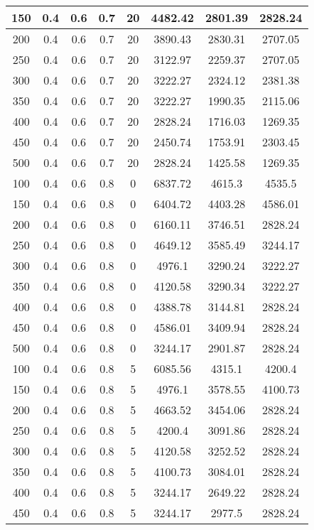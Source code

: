 \documentclass[a4paper, 12pt]{extreport}
\begin{document}
\begin{itemize}
\begin{longtable}{|c|c|c|c|c|c|c|c|}
			150 & 0.4 & 0.6 & 0.7 & 20 & 4482.42 & 2801.39 & 2828.24 \\\hline
			200 & 0.4 & 0.6 & 0.7 & 20 & 3890.43 & 2830.31 & 2707.05 \\\hline
			250 & 0.4 & 0.6 & 0.7 & 20 & 3122.97 & 2259.37 & 2707.05 \\\hline
			300 & 0.4 & 0.6 & 0.7 & 20 & 3222.27 & 2324.12 & 2381.38 \\\hline
			350 & 0.4 & 0.6 & 0.7 & 20 & 3222.27 & 1990.35 & 2115.06 \\\hline
			400 & 0.4 & 0.6 & 0.7 & 20 & 2828.24 & 1716.03 & 1269.35 \\\hline
			450 & 0.4 & 0.6 & 0.7 & 20 & 2450.74 & 1753.91 & 2303.45 \\\hline
			500 & 0.4 & 0.6 & 0.7 & 20 & 2828.24 & 1425.58 & 1269.35 \\\hline
			100 & 0.4 & 0.6 & 0.8 & 0 & 6837.72 & 4615.3 & 4535.5 \\\hline
			150 & 0.4 & 0.6 & 0.8 & 0 & 6404.72 & 4403.28 & 4586.01 \\\hline
			200 & 0.4 & 0.6 & 0.8 & 0 & 6160.11 & 3746.51 & 2828.24 \\\hline
			250 & 0.4 & 0.6 & 0.8 & 0 & 4649.12 & 3585.49 & 3244.17 \\\hline
			300 & 0.4 & 0.6 & 0.8 & 0 & 4976.1 & 3290.24 & 3222.27 \\\hline
			350 & 0.4 & 0.6 & 0.8 & 0 & 4120.58 & 3290.34 & 3222.27 \\\hline
			400 & 0.4 & 0.6 & 0.8 & 0 & 4388.78 & 3144.81 & 2828.24 \\\hline
			450 & 0.4 & 0.6 & 0.8 & 0 & 4586.01 & 3409.94 & 2828.24 \\\hline
			500 & 0.4 & 0.6 & 0.8 & 0 & 3244.17 & 2901.87 & 2828.24 \\\hline
			100 & 0.4 & 0.6 & 0.8 & 5 & 6085.56 & 4315.1 & 4200.4 \\\hline
			150 & 0.4 & 0.6 & 0.8 & 5 & 4976.1 & 3578.55 & 4100.73 \\\hline
			200 & 0.4 & 0.6 & 0.8 & 5 & 4663.52 & 3454.06 & 2828.24 \\\hline
			250 & 0.4 & 0.6 & 0.8 & 5 & 4200.4 & 3091.86 & 2828.24 \\\hline
			300 & 0.4 & 0.6 & 0.8 & 5 & 4120.58 & 3252.52 & 2828.24 \\\hline
			350 & 0.4 & 0.6 & 0.8 & 5 & 4100.73 & 3084.01 & 2828.24 \\\hline
			400 & 0.4 & 0.6 & 0.8 & 5 & 3244.17 & 2649.22 & 2828.24 \\\hline
			450 & 0.4 & 0.6 & 0.8 & 5 & 3244.17 & 2977.5 & 2828.24 \\\hline

\end{longtable}
\end{itemize}
\end{document}
